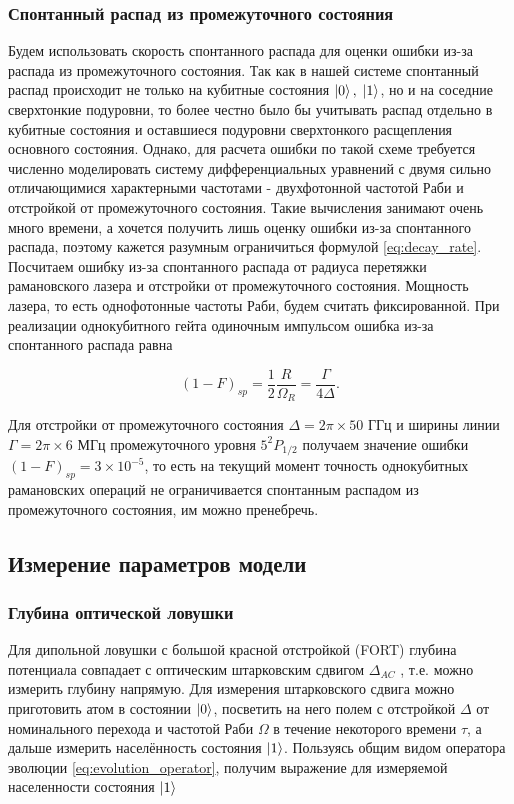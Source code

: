 \subsubsection{Спонтанный распад из промежуточного состояния}

Будем использовать скорость спонтанного распада для оценки ошибки из-за распада из промежуточного состояния. Так как в нашей системе спонтанный распад происходит не только на кубитные состояния $\left| 0 \right\rangle, \; \left| 1 \right\rangle$, но и на соседние сверхтонкие подуровни, то более честно было бы учитывать распад отдельно в кубитные состояния и оставшиеся подуровни сверхтонкого расщепления основного состояния. Однако, для расчета ошибки по такой схеме требуется численно моделировать систему дифференциальных уравнений с двумя сильно отличающимися характерными частотами - двухфотонной частотой Раби и отстройкой от промежуточного состояния. Такие вычисления занимают очень много времени, а хочется получить лишь оценку ошибки из-за спонтанного распада, поэтому кажется разумным ограничиться формулой \ref{eq:decay_rate}. Посчитаем ошибку из-за спонтанного распада от радиуса перетяжки рамановского лазера и отстройки от промежуточного состояния. Мощность лазера, то есть однофотонные частоты Раби, будем считать фиксированной. При реализации однокубитного гейта одиночным импульсом ошибка из-за спонтанного распада равна 

\begin{equation}
	(1-F)_{sp}=\frac{1}{2}\frac{R}{\Omega_{R}} = \frac{\Gamma}{4\Delta}.
\end{equation}

Для отстройки от промежуточного состояния $\Delta = 2\pi \times 50 \text{ ГГц}$ и ширины линии $\Gamma = 2\pi \times 6 \text{ МГц}$ \cite{Rb87} промежуточного уровня $5^2P_{1/2}$ получаем значение ошибки $(1-F)_{sp} = 3 \times 10^{-5}$, то есть на текущий момент точность однокубитных рамановских операций не ограничивается спонтанным распадом из промежуточного состояния, им можно пренебречь.

\subsection{Измерение параметров модели}

\subsubsection{Глубина оптической ловушки}

Для дипольной ловушки с большой красной отстройкой (FORT) глубина потенциала совпадает с оптическим штарковским сдвигом $\Delta_{AC}$ \cite{grimm1999optical}, т.е. можно измерить глубину напрямую. Для измерения штарковского сдвига можно приготовить атом в состоянии $\left| 0 \right\rangle$, посветить на него полем с отстройкой $\Delta$ от номинального перехода и частотой Раби $\Omega$ в течение некоторого времени $\tau$, а дальше измерить населённость состояния $\left| 1 \right\rangle$. Пользуясь общим видом оператора эволюции \ref{eq:evolution_operator}, получим выражение для измеряемой населенности состояния $\left| 1 \right\rangle$

